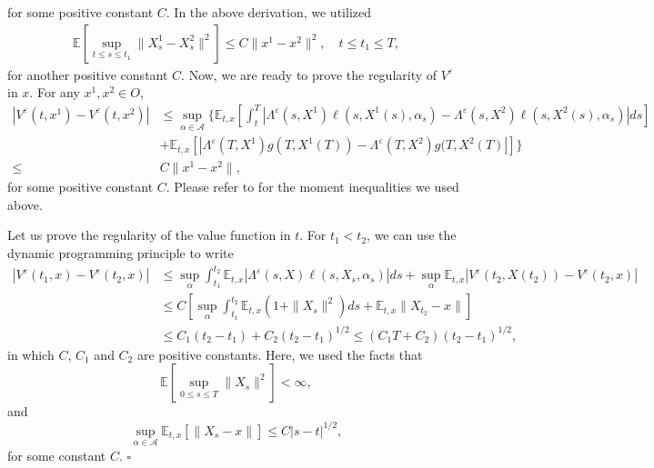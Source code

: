 \documentclass[11pt,reqno]{amsart}
\numberwithin{equation}{section}
\newcommand{\E}{\mathbb{E}}
\begin{document}
  for some positive constant $C$.
In the above derivation, we utilized 
  $$\begin{array}{ll}
    \mathbb{E} \left[\sup_{t\le s \le t_1} \|X^1_s - X^2_s\|^2\right] \le C
    \|x^1 - x^2\|^2, \quad t\le t_1 \le T,
  \end{array}$$
  for another positive constant $C$.
  Now, we are ready to prove the regularity of $V^\varepsilon$ in $x$. For any
  $x^1, x^2 \in O$,
  \begin{equation*}
  \begin{split}
    |V^\varepsilon(t,x^1) - V^\varepsilon (t,x^2)|
      &\le \sup_{\alpha \in \mathcal{A}} \Bigg\{\mathbb{E}_{t,x}\left[ \int_t^T|\Lambda^\varepsilon(s,X^1) \ell (s,
    X^1(s), \alpha_s) - \Lambda^\varepsilon (s, X^2) \ell(s, X^2(s),
    \alpha_s)| ds\right] \\
   & +\mathbb{E}_{t,x}\left[ \left|\Lambda^\varepsilon(T,X^1) g(T,X^1(T)) -
    \Lambda^\varepsilon(T,X^2) g(T,X^2(T)\right|\right]\Bigg\} \\
    \le & C \|x^1 - x^2\|,
 \end{split}
  \end{equation*}
  for some positive constant $C$. Please refer to \cite{Kry80} for the moment inequalities we used above.
  
  Let us prove the regularity of the value function in $t$. For $t_1<t_2$, we can use the dynamic programming principle to write
  \begin{equation*}
  \begin{split}
    |V^\varepsilon(t_1,x) - V^\varepsilon(t_2,x)|
     &\le \sup_{\alpha} \int_{t_1}^{t_2} \mathbb{E}_{t,x}
    |\Lambda^\varepsilon (s,X) \ell (s,X_s,\alpha_s)| ds +
    \sup_\alpha \mathbb{E}_{t,x} 
    |V^\varepsilon (t_2,X(t_2)) - V^\varepsilon (t_2,x)| \\
    & \le C \left[ \sup_\alpha \int_{t_1}^{t_2} \mathbb{E}_{t,x}
    \left(1+\|X_s\|^2 \right) ds + \mathbb{E}_{t,x} \|X_{t_2}-
    x\| \right]\\ 
    &\le C_1 (t_2 - t_1) +C_2 (t_2 - t_1)^{1/2} \le (C_1 T+C_2) (t_2 - t_1)^{1/2},     
  \end{split}\end{equation*}
  in which $C$, $C_1$ and $C_2$ are positive constants. Here, we used the facts that
  \[
  \E \left[\sup_{0 \leq s \leq T} \|X_s\|^2\right]<\infty,
  \]
 and 
 \[
\sup_{\alpha \in \mathcal{A}} \E_{t,x}\left[\left\|X_s-x\right\|\right] \leq C |s-t|^{1/2},
 \]
 for some constant $C$. \hfill $\square$
\end{document}
